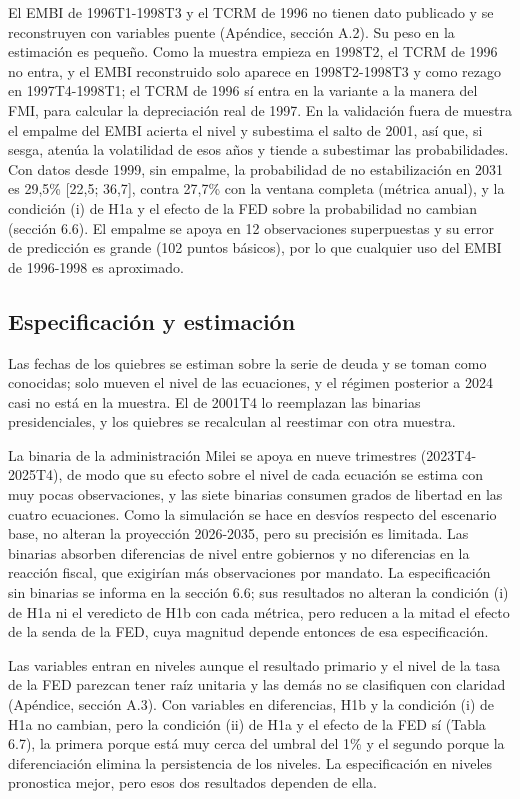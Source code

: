 El EMBI de 1996T1-1998T3 y el TCRM de 1996 no tienen dato publicado y se
reconstruyen con variables puente (Apéndice, sección A.2). Su peso en la
estimación es pequeño. Como la muestra empieza en 1998T2, el TCRM de
1996 no entra, y el EMBI reconstruido solo aparece en 1998T2-1998T3 y
como rezago en 1997T4-1998T1; el TCRM de 1996 sí entra en la variante a
la manera del FMI, para calcular la depreciación real de 1997. En la
validación fuera de muestra el empalme del EMBI acierta el nivel y
subestima el salto de 2001, así que, si sesga, atenúa la volatilidad de
esos años y tiende a subestimar las probabilidades. Con datos desde
1999, sin empalme, la probabilidad de no estabilización en 2031 es
29,5\% {[}22,5; 36,7{]}, contra 27,7\% con la ventana completa (métrica
anual), y la condición (i) de H1a y el efecto de la FED sobre la
probabilidad no cambian (sección 6.6). El empalme se apoya en 12
observaciones superpuestas y su error de predicción es grande (102
puntos básicos), por lo que cualquier uso del EMBI de 1996-1998 es
aproximado.

\subsection{Especificación y estimación}

Las fechas de los quiebres se estiman sobre la serie de deuda y se toman
como conocidas; solo mueven el nivel de las ecuaciones, y el régimen
posterior a 2024 casi no está en la muestra. El de 2001T4 lo reemplazan
las binarias presidenciales, y los quiebres se recalculan al reestimar
con otra muestra.

La binaria de la administración Milei se apoya en nueve trimestres
(2023T4-2025T4), de modo que su efecto sobre el nivel de cada ecuación
se estima con muy pocas observaciones, y las siete binarias consumen
grados de libertad en las cuatro ecuaciones. Como la simulación se hace
en desvíos respecto del escenario base, no alteran la proyección
2026-2035, pero su precisión es limitada. Las binarias absorben
diferencias de nivel entre gobiernos y no diferencias en la reacción
fiscal, que exigirían más observaciones por mandato. La especificación
sin binarias se informa en la sección 6.6; sus resultados no alteran la
condición (i) de H1a ni el veredicto de H1b con cada métrica, pero
reducen a la mitad el efecto de la senda de la FED, cuya magnitud
depende entonces de esa especificación.

Las variables entran en niveles aunque el resultado primario y el nivel
de la tasa de la FED parezcan tener raíz unitaria y las demás no se
clasifiquen con claridad (Apéndice, sección A.3). Con variables en
diferencias, H1b y la condición (i) de H1a no cambian, pero la condición
(ii) de H1a y el efecto de la FED sí (Tabla 6.7), la primera porque está
muy cerca del umbral del 1\% y el segundo porque la diferenciación
elimina la persistencia de los niveles. La especificación en niveles
pronostica mejor, pero esos dos resultados dependen de ella.

